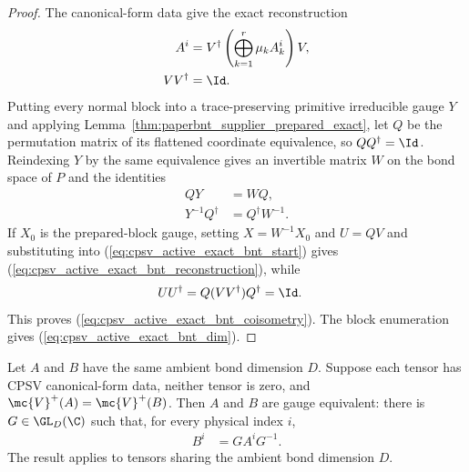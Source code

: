 \begin{proof}\leanok
    The canonical-form data give the exact reconstruction
    \begin{align}
        A^i        & =V^\dagger\left(\bigoplus_{k=1}^{r}\mu_kA_k^i\right)V,
        \label{eq:cpsv_active_exact_bnt_start}                              \\
        VV^\dagger & =\Id.
        \label{eq:cpsv_active_exact_bnt_start_coisometry}
    \end{align}
    Putting every normal block into a trace-preserving primitive irreducible
    gauge $Y$ and applying
    Lemma~\ref{thm:paperbnt_supplier_prepared_exact}, let $Q$ be the
    permutation matrix of its flattened coordinate equivalence, so
    $QQ^\dagger=\Id$. Reindexing $Y$ by the same equivalence gives an
    invertible matrix $W$ on the bond space of $P$ and the identities
    \begin{align}
        QY              & =WQ,
        \label{eq:cpsv_active_exact_bnt_intertwining} \\
        Y^{-1}Q^\dagger & =Q^\dagger W^{-1}.
        \label{eq:cpsv_active_exact_bnt_intertwining_inv}
    \end{align}
    If $X_0$ is the prepared-block gauge, setting
    $X=W^{-1}X_0$ and $U=QV$ and substituting into
    (\ref{eq:cpsv_active_exact_bnt_start}) gives
    (\ref{eq:cpsv_active_exact_bnt_reconstruction}), while
    \begin{align}
        UU^\dagger
         & =Q(VV^\dagger)Q^\dagger=\Id.
        \notag
    \end{align}
    This proves (\ref{eq:cpsv_active_exact_bnt_coisometry}). The block
    enumeration gives (\ref{eq:cpsv_active_exact_bnt_dim}).
\end{proof}

\begin{lemma}%
    \label{thm:cpsv_equal_ambient_gauge}
    \leanok
    Let $A$ and $B$ have the same ambient bond dimension $D$. Suppose each
    tensor has CPSV canonical-form data, neither tensor is zero, and $\mc{V}^+(A)=\mc{V}^+(B)$. Then $A$ and $B$ are gauge equivalent:
    there is
    $G\in\GL_D(\C)$ such that, for every physical index $i$,
    \begin{align}
        B^i & =GA^iG^{-1}.
        \label{eq:cpsv_equal_ambient_gauge}
    \end{align}
    The result applies to tensors sharing the ambient bond dimension $D$.
\end{lemma}

